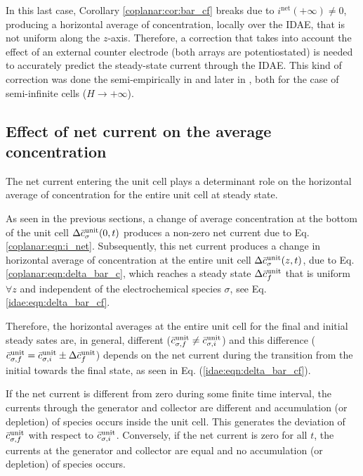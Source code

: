 In this last case,
Corollary \ref{coplanar:cor:bar_cf} breaks due to $i^{\text{net}}(+\infty) \neq 0$,
producing a horizontal average of concentration, locally over the IDAE,
that is not uniform along the $z$-axis.
Therefore, a correction that takes into account
the effect of an external counter electrode (both arrays are potentiostated)
is needed to accurately predict the steady-state current through the IDAE.
This kind of correction was done the semi-empirically in \cite[Eq. (33)]{Aoki:1988:dec}
and later in \cite[Eqs. (13) and (20)]{Morf:2006:may}, both for the case of semi-infinite cells ($H \to +\infty$).


\subsection{Effect of net current on the average concentration}

The net current entering the unit cell
plays a determinant role on the horizontal average of concentration
for the entire unit cell at steady state.

As seen in the previous sections, a change of average concentration
at the bottom of the unit cell $\Delta\bar{c}_{\sigma}^{\text{unit}}(0,t)$
produces a non-zero net current due to Eq. \eqref{coplanar:eqn:i_net}.
Subsequently, this net current produces a change in horizontal average of concentration
at the entire unit cell $\Delta\bar{c}_{\sigma}^{\text{unit}}(z,t)$, due to Eq. \eqref{coplanar:eqn:delta_bar_c},
which reaches a steady state $\Delta\bar{c}_{f}^{\text{unit}}$
that is uniform $\forall z$ and independent of the electrochemical species $\sigma$, see Eq. \eqref{idae:eqn:delta_bar_cf}.

Therefore, the horizontal averages at the entire unit cell
for the final and initial steady sates are, in general, different
($\bar{c}_{\sigma,f}^{\text{unit}} \neq \bar{c}_{\sigma,i}^{\text{unit}}$) and this difference
($\bar{c}_{\sigma,f}^{\text{unit}} = \bar{c}_{\sigma,i}^{\text{unit}} \pm \Delta \bar{c}_{f}^{\text{unit}}$)
depends on the net current during the transition
from the initial towards the final state,
as seen in Eq. (\ref{idae:eqn:delta_bar_cf}).

If the net current is different from zero
during some finite time interval,
the currents through the generator and collector are different
and accumulation (or depletion) of species occurs inside the unit cell.
This generates the deviation of $\bar{c}_{\sigma,f}^{\text{unit}}$ with respect to $\bar{c}_{\sigma,i}^{\text{unit}}$.
Conversely, if the net current is zero for all $t$,
the currents at the generator and collector are equal
and no accumulation (or depletion) of species occurs.

